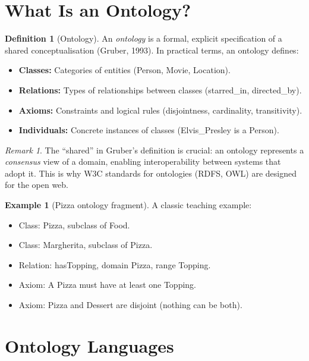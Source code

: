 \documentclass[11pt,a4paper,oneside,openany]{book}
\theoremstyle{definition}
\newtheorem{definition}{Definition}[chapter]
\newtheorem{example}{Example}[chapter]
\theoremstyle{plain}
\theoremstyle{remark}
\newtheorem{remark}{Remark}[chapter]
\begin{document}
\section{What Is an Ontology?}\label{sec:ontology-def}

\begin{definition}[Ontology]
	An \emph{ontology} is a formal, explicit specification of a shared conceptualisation (Gruber, 1993). In practical terms, an ontology defines:
	\begin{itemize}
		\item \textbf{Classes:} Categories of entities (Person, Movie, Location).
		\item \textbf{Relations:} Types of relationships between classes (starred\_in, directed\_by).
		\item \textbf{Axioms:} Constraints and logical rules (disjointness, cardinality, transitivity).
		\item \textbf{Individuals:} Concrete instances of classes (Elvis\_Presley is a Person).
	\end{itemize}
\end{definition}

\begin{remark}
	The ``shared'' in Gruber's definition is crucial: an ontology represents a \emph{consensus} view of a domain, enabling interoperability between systems that adopt it. This is why W3C standards for ontologies (RDFS, OWL) are designed for the open web.
\end{remark}

\begin{example}[Pizza ontology fragment]
	A classic teaching example:
	\begin{itemize}
		\item Class: Pizza, subclass of Food.
		\item Class: Margherita, subclass of Pizza.
		\item Relation: hasTopping, domain Pizza, range Topping.
		\item Axiom: A Pizza must have at least one Topping.
		\item Axiom: Pizza and Dessert are disjoint (nothing can be both).
	\end{itemize}
\end{example}

\section{Ontology Languages}\label{sec:onto-lang}
\end{document}
